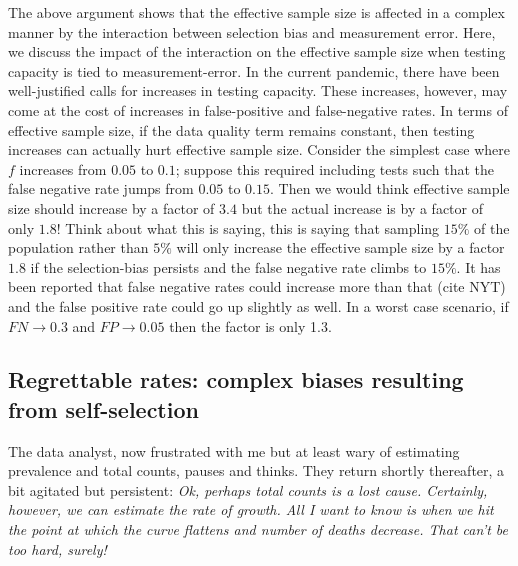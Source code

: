\documentclass[aoas]{amsart}
\begin{document}
The above argument shows that the effective sample size is affected in a complex manner by the interaction between selection bias and measurement error.  Here, we discuss the impact of the interaction on the effective sample size when testing capacity is tied to measurement-error.  In the current pandemic, there have been well-justified calls for increases in testing capacity.  These increases, however, may come at the cost of increases in false-positive and false-negative rates.  In terms of effective sample size, if the data quality term remains constant, then testing increases can actually hurt effective sample size.  Consider the simplest case where $f$ increases from $0.05$ to $0.1$; suppose this required including tests such that the false negative rate jumps from $0.05$ to $0.15$.  Then we would think effective sample size should increase by a factor of $3.4$ but the actual increase is by a factor of only $1.8$!  Think about what this is saying, this is saying that sampling $15\%$ of the population rather than $5\%$ will only increase the effective sample size by a factor $1.8$ if the selection-bias persists and the false negative rate climbs to $15\%$.   It has been reported that false negative rates could increase more than that (cite NYT) and the false positive rate could go up slightly as well.  In a worst case scenario, if $FN \to 0.3$ and $FP \to 0.05$ then the factor is only 1.3.

\subsection{Regrettable rates: complex biases resulting from self-selection}
\label{section:rates}

The data analyst, now frustrated with me but at least wary of estimating prevalence and total counts, pauses and thinks.  They return shortly thereafter, a bit agitated but persistent: \emph{Ok, perhaps total counts is a lost cause. Certainly, however, we can estimate the rate of growth.  All I want to know is when we hit the point at which the curve flattens and number of deaths decrease.  That can't be too hard, surely!}
\end{document}
